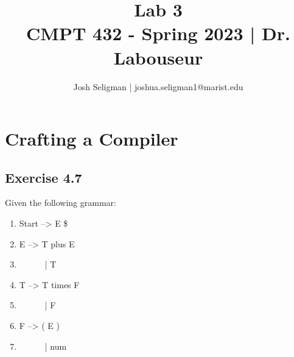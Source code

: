 \documentclass[letterpaper, 10pt, DIV=13]{scrartcl}
\title {
	\normalfont
	\huge{Lab 3} \\
	\vspace{10pt}
	\large{CMPT 432 - Spring 2023 | Dr. Labouseur}
}
\author{\normalfont Josh Seligman | joshua.seligman1@marist.edu}
\numberwithin{equation}{section}
\numberwithin{figure}{section}
\numberwithin{table}{section}
\begin{document}
\maketitle

\section{Crafting a Compiler}
\subsection{Exercise 4.7}
Given the following grammar:
\begin{enumerate}
    \item Start --> E \$
    \item E --> T plus E
    \item ~~~~~~| T
    \item T --> T times F
    \item ~~~~~~| F
    \item F --> ( E )
    \item ~~~~~~| num
\end{enumerate}
\end{document}
